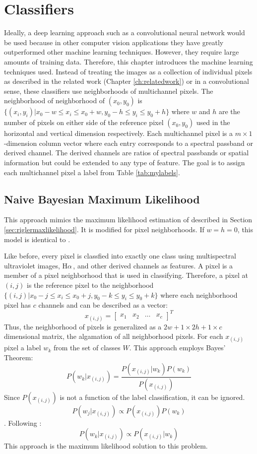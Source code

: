 \documentclass[twoside]{report}
\newcommand{\halpha}{H$\alpha$\,}
\newcommand{\todo}[1]{{\color{red}{\textbf{#1}}}}
\begin{document}
\todo{perform analysis}




\chapter{Classifiers} \label{ch:classifiers}

Ideally, a deep learning approach such as a convolutional neural network would be used because in other computer vision applications they have greatly outperformed other machine learning techniques. However, they require large amounts of training data. Therefore, this chapter introduces the machine learning techniques used. Instead of treating the images as a collection of individual pixels as described in the related work (Chapter \ref{ch:relatedwork}) or in a convolutional sense, these classifiers use neighborhoods of multichannel pixels. The neighborhood of neighborhood of $(x_0, y_0)$ is $\{(x_i, y_i) | x_0 - w \le x_i \le x_0 + w, y_0 - h \le y_i \le y_0 + h\}$  where $w$ and $h$ are the number of pixels on either side of the reference pixel $(x_0, y_0)$ used in the horizontal and vertical dimension respectively. Each multichannel pixel is a $m \times 1$-dimension column vector where each entry corresponds to a spectral passband or derived channel. The derived channels are ratios of spectral passbands or spatial information but could be extended to any type of feature. The goal is to assign each multichannel pixel a label from Table \ref{tab:mylabels}. 

\section{Naive Bayesian Maximum Likelihood}

This approach mimics the maximum likelihood estimation of \cite{rigler:2012} described in Section \ref{sec:riglermaxlikelihood}. It is modified for pixel neighborhoods. If $w=h=0$, this model is identical to \cite{rigler:2012}. 

Like before, every pixel is classfied into exactly one class using multispectral ultraviolet images, \halpha, and other derived channels as features. A pixel is a member of a pixel neighborhood that is used in classifying. Therefore, a pixel at $(i,j)$ is the reference pixel to the neighborhood $\{(i, j) | x_0 - j \le x_i \le x_0 + j, y_0 - k \le y_i \le y_0 + k\}$ where each neighborhood pixel has $c$ channels and can be described as a vector:
\[x_{(i,j)} = \begin{bmatrix} x_1 & x_2 & \hdots & x_c \end{bmatrix}^T \]
Thus, the neighborhood of pixels is generalized as a $2w + 1 \times 2h + 1 \times c$ dimensional matrix, the algamation of all neighborhood pixels. 
For each $x_{(i,j)}$ pixel a label $w_k$ from the set of classes $W$. This approach employs Bayes' Theorem:
\[ P(w_k | x_{(i,j)}) = \frac{P(x_{(i,j)} | w_k) P(w_k)}{P(x_{(i,j)})} \]
Since $P(x_{(i,j)})$ is not a function of the label classification, it can be ignored.
\[ P(w_j | x_{(i,j)}) \propto P(x_{(i,j)}) P(w_{k}) \].
Following \cite{rigler:2012}: 
\[ P(w_k | x_{(i,j)}) \propto P(x_{(i,j)} | w_k) \]
This approach is the maximum likelihood solution to this problem.
\end{document}
